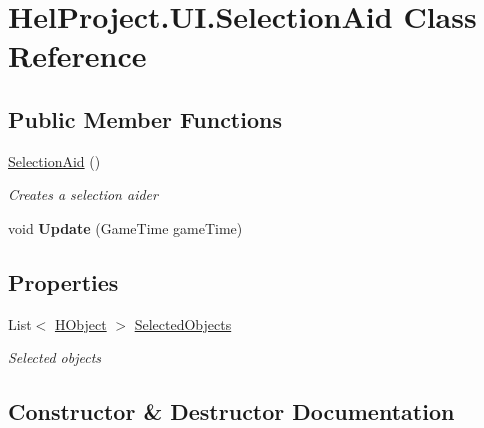 \hypertarget{class_hel_project_1_1_u_i_1_1_selection_aid}{}\section{Hel\+Project.\+U\+I.\+Selection\+Aid Class Reference}
\label{class_hel_project_1_1_u_i_1_1_selection_aid}
\subsection*{Public Member Functions}
\begin{DoxyCompactItemize}
\item 
\hyperlink{class_hel_project_1_1_u_i_1_1_selection_aid_a52416155516cd83bbd3ce46576dd7aa3}{Selection\+Aid} ()
\begin{DoxyCompactList}\small\item\em Creates a selection aider \end{DoxyCompactList}\item 
\hypertarget{class_hel_project_1_1_u_i_1_1_selection_aid_acfc8f6b11a692c7d8167069485d6cb99}{}void {\bfseries Update} (Game\+Time game\+Time)\label{class_hel_project_1_1_u_i_1_1_selection_aid_acfc8f6b11a692c7d8167069485d6cb99}

\end{DoxyCompactItemize}
\subsection*{Properties}
\begin{DoxyCompactItemize}
\item 
List$<$ \hyperlink{class_hel_project_1_1_game_world_1_1_h_object}{H\+Object} $>$ \hyperlink{class_hel_project_1_1_u_i_1_1_selection_aid_aaa9cbcc7523bd3a67a0d8fcdd59ff8cd}{Selected\+Objects}
\begin{DoxyCompactList}\small\item\em Selected objects \end{DoxyCompactList}\end{DoxyCompactItemize}


\subsection{Constructor \& Destructor Documentation}
\hypertarget{class_hel_project_1_1_u_i_1_1_selection_aid_a52416155516cd83bbd3ce46576dd7aa3}{}
